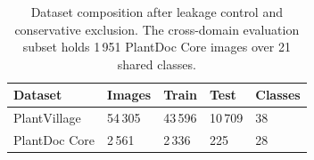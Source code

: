 \begin{table}[htbp]
\caption{Dataset composition after leakage control and conservative exclusion. The cross-domain evaluation subset holds 1\,951 PlantDoc Core images over 21 shared classes.}
\label{tab:dataset-stats}
\centering
\begin{tabular}{lllll}
\toprule
Dataset & Images & Train & Test & Classes \\
\midrule
PlantVillage & 54\,305 & 43\,596 & 10\,709 & 38 \\
PlantDoc Core & 2\,561 & 2\,336 & 225 & 28 \\
\bottomrule
\end{tabular}
\end{table}

